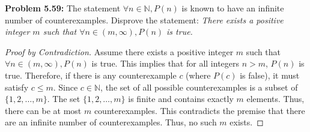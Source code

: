 \documentclass[11pt, a4paper]{article}
\theoremstyle{definition}
\theoremstyle{remark}
\newcommand{\N}{\mathbb{N}}
\begin{document}
\textbf{Problem 5.59:} The statement $\forall n \in \N, P(n)$ is known to have an infinite number of counterexamples. Disprove the statement: \textit{There exists a positive integer $m$ such that $\forall n \in (m, \infty), P(n)$ is true.}
\begin{proof}[Proof by Contradiction]
    Assume there exists a positive integer $m$ such that $\forall n \in (m, \infty), P(n)$ is true.
    This implies that for all integers $n > m$, $P(n)$ is true. 
    Therefore, if there is any counterexample $c$ (where $P(c)$ is false), it must satisfy $c \le m$.
    Since $c \in \N$, the set of all possible counterexamples is a subset of $\{1, 2, \dots, m\}$.
    The set $\{1, 2, \dots, m\}$ is finite and contains exactly $m$ elements. Thus, there can be at most $m$ counterexamples.
    This contradicts the premise that there are an infinite number of counterexamples. Thus, no such $m$ exists.
\end{proof}
\end{document}
